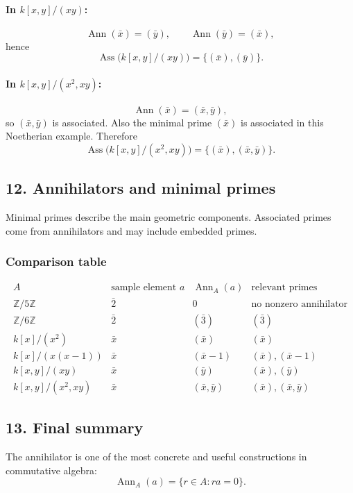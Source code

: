 \documentclass[12pt,a4paper,oneside]{report}
\DeclareMathOperator{\Ass}{Ass}
\DeclareMathOperator{\Ann}{Ann}
\theoremstyle{notespace}
\begin{document}
	\paragraph{In \(k[x,y]/(xy)\):}
	\[
	\Ann(\bar x)=(\bar y),\qquad \Ann(\bar y)=(\bar x),
	\]
	hence
	\[
	\Ass\bigl(k[x,y]/(xy)\bigr)=\{(\bar x),(\bar y)\}.
	\]
	
	\paragraph{In \(k[x,y]/(x^2,xy)\):}
	\[
	\Ann(\bar x)=(\bar x,\bar y),
	\]
	so \((\bar x,\bar y)\) is associated. Also the minimal prime \((\bar x)\) is associated in this Noetherian example. Therefore
	\[
	\Ass\bigl(k[x,y]/(x^2,xy)\bigr)=\{(\bar x),(\bar x,\bar y)\}.
	\]
	
	\subsection{12. Annihilators and minimal primes}
	
	Minimal primes describe the main geometric components. Associated primes come from annihilators and may include embedded primes.
	
	\subsubsection{Comparison table}
	\[
	\begin{array}{c|c|c|c}
		A & \text{sample element }a & \Ann_A(a) & \text{relevant primes}\\
		\hline
		\mathbb Z/5\mathbb Z & \bar 2 & 0 & \text{no nonzero annihilator}\\[4pt]
		\mathbb Z/6\mathbb Z & \bar 2 & (\bar 3) & (\bar 3)\\[4pt]
		k[x]/(x^2) & \bar x & (\bar x) & (\bar x)\\[4pt]
		k[x]/(x(x-1)) & \bar x & (\bar x-1) & (\bar x),(\bar x-1)\\[4pt]
		k[x,y]/(xy) & \bar x & (\bar y) & (\bar x),(\bar y)\\[4pt]
		k[x,y]/(x^2,xy) & \bar x & (\bar x,\bar y) & (\bar x),(\bar x,\bar y)
	\end{array}
	\]
	
	\subsection{13. Final summary}
	
	The annihilator is one of the most concrete and useful constructions in commutative algebra:
	\[
	\Ann_A(a)=\{r\in A:ra=0\}.
	\]
	
\end{document}

